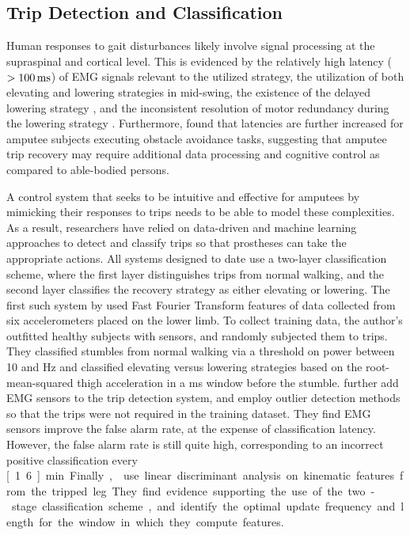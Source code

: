\subsection{Trip Detection and Classification}
Human responses to gait disturbances likely involve signal processing at the
supraspinal and cortical level. This is evidenced by the relatively high latency
($>\unit[100]{ms}$) of EMG signals relevant to the utilized strategy, the
utilization of both elevating and lowering strategies in mid-swing, the
existence of the delayed lowering strategy \citep{schillings2000muscular}, and
the inconsistent resolution of motor redundancy during the lowering strategy
\citep{eng1994strategies}. Furthermore, \citet{hofstad2009evidence} found that
latencies are further increased for amputee subjects executing obstacle
avoidance tasks, suggesting that amputee trip recovery may require additional
data processing and cognitive control as compared to able-bodied persons. 

A control system that seeks to be intuitive and effective for amputees by
mimicking their responses to trips needs to be able to model these complexities.
As a result, researchers have relied on data-driven and machine learning
approaches to detect and classify trips so that prostheses can take the
appropriate actions. All systems designed to date use a two-layer classification
scheme, where the first layer distinguishes trips from normal walking, and the
second layer classifies the recovery strategy as either elevating or lowering.
The first such system by \citet{lawson2010stumble} used Fast Fourier Transform
features of data collected from six accelerometers placed on the lower limb. To
collect training data, the author's outfitted healthy subjects with sensors, and
randomly subjected them to trips. They classified stumbles from normal walking
via a threshold on power between 10 and \unit[40]{Hz} and classified elevating
versus lowering strategies based on the root-mean-squared thigh acceleration in
a \unit[50]{ms} window before the stumble. \citet{zhang2011towards} further add
EMG sensors to the trip detection system, and employ outlier detection methods
so that the trips were not required in the training dataset. They find EMG sensors
improve the false alarm rate, at the expense of classification latency. However,
the false alarm rate is still quite high, corresponding to an incorrect positive
classification every \unit[1.6]{min}. Finally, \citet{shirota2014recovery} use
linear discriminant analysis on kinematic features from the tripped leg. They
find evidence supporting the use of the two-stage classification scheme, and
identify the optimal update frequency and length for the window in which they
compute features.

